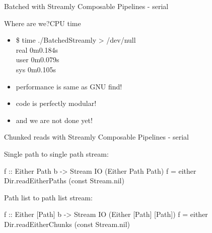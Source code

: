 \documentclass[17pt]{beamer}
\begin{document}
\begin{frame}[fragile]{Batched with Streamly}
{Composable Pipelines - serial}
\tiny
\begin{minipage}{\textwidth}
\end{minipage}
\end{frame}

\begin{frame}{Where are we?}{CPU time}

\begin{itemize}
\item \$ time ./BatchedStreamly > /dev/null \\
real    0m0.184s \\
user    0m0.079s \\
sys     0m0.105s \\

\item performance is same as GNU find!
\item code is perfectly modular!
\item and we are not done yet!
\end{itemize}
\end{frame}

%

\begin{frame}[fragile]{Chunked reads with Streamly}
{Composable Pipelines - serial}
\begin{minipage}{\textwidth}

Single path to single path stream:
\begin{code}
f :: Either Path b -> Stream IO (Either Path Path)
f = either Dir.readEitherPaths (const Stream.nil)
\end{code}

Path list to path list stream:
\begin{code}
f :: Either [Path] b
  -> Stream IO (Either [Path] [Path])
f = either Dir.readEitherChunks (const Stream.nil)

\end{code}
\end{minipage}
\end{frame}
\end{document}
